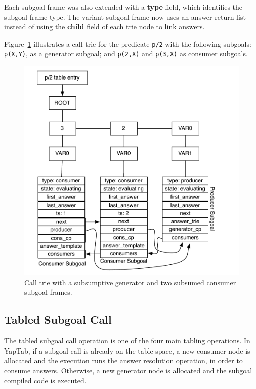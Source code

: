 Each subgoal frame was also extended with a \textbf{type} field, which identifies the subgoal frame type.
The variant subgoal frame now uses an answer return list instead of using the \textbf{child} field of
each trie node to link answers.

Figure~\ref{fig:subgoal_frames} illustrates a call trie for the predicate \texttt{p/2}
with the following subgoals: \texttt{p(X,Y)}, as a generator subgoal; and \texttt{p(2,X)} and
\texttt{p(3,X)} as consumer subgoals.

\begin{figure}[h]
  \centering
    \includegraphics[scale=0.6]{subgoal_frames.pdf}
  \caption{Call trie with a subsumptive generator and two subsumed consumer subgoal frames.}
  \label{fig:subgoal_frames}
\end{figure}

\subsection{Tabled Subgoal Call}

The tabled subgoal call operation is one of the four main tabling operations. In YapTab,
if a subgoal call is already on the table space, a new consumer node is allocated and
the execution runs the answer resolution operation, in order to consume answers.
Otherwise, a new generator node is allocated and the subgoal compiled code is executed.

